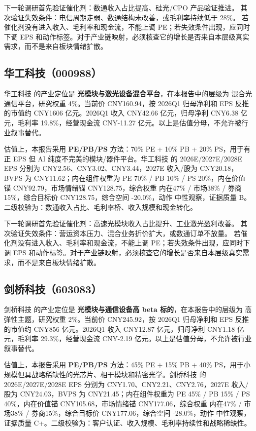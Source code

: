 下一轮调研首先验证催化剂：数通收入占比提高、硅光/CPO 产品验证推进。 其次验证失效条件：电信周期走弱、数通结构未改善，或毛利率持续低于 28\%。 若催化剂没有进入收入、毛利率和现金流，不能上调 PE；若失效条件出现，应同时下调 EPS 和动作标签。对于产业链映射，必须核查它的增长是否来自本层级真实需求，而不是来自板块情绪扩散。


\subsection{华工科技（000988）}
华工科技 的产业定位是 \textbf{光模块与激光设备混合平台}，在本报告中的层级为 混合光通信平台，研究权重 4\%。当前价 CNY160.94，按 2026Q1 归母净利和 EPS 反推的市值约 CNY1606 亿元。2026Q1 收入 CNY42.66 亿元，归母净利 CNY6.38 亿元，毛利率 19.8\%，经营现金流 CNY-11.27 亿元。以上是估值分母，不允许被行业叙事替代。

估值上，本报告采用 \textbf{PE/PB/PS} 方法：70\% PE + 10\% PB + 20\% PS，用于有正 EPS 但 AI 纯度不完美的模块/器件平台。华工科技 的 2026E/2027E/2028E EPS 分别为 CNY2.56、CNY3.02、CNY3.44，2027E 收入/股为 CNY20.18，BVPS 为 CNY11.62；内在组件权重为 PE 70\% / PB 10\% / PS 20\%，内在价值锚 CNY92.79，市场情绪锚 CNY128.75，综合权重 内在47\% / 市场38\% / 券商15\%，综合目标价 CNY128.75，综合空间 -20.0\%，动作 中性观察，证据质量 B。二级校验为：数通收入占比、毛利率桥、收入规模和现金转化。

下一轮调研首先验证催化剂：高速光模块收入占比提升、工业激光盈利改善。 其次验证失效条件：营运资本压力、混合业务折价扩大，或数通订单不放量。 若催化剂没有进入收入、毛利率和现金流，不能上调 PE；若失效条件出现，应同时下调 EPS 和动作标签。对于产业链映射，必须核查它的增长是否来自本层级真实需求，而不是来自板块情绪扩散。


\subsection{剑桥科技（603083）}
剑桥科技 的产业定位是 \textbf{光模块与通信设备高 beta 标的}，在本报告中的层级为 高弹性主题，研究权重 2\%。当前价 CNY245.92，按 2026Q1 归母净利和 EPS 反推的市值约 CNY856 亿元。2026Q1 收入 CNY12.87 亿元，归母净利 CNY1.18 亿元，毛利率 29.3\%，经营现金流 CNY-2.19 亿元。以上是估值分母，不允许被行业叙事替代。

估值上，本报告采用 \textbf{PE/PB/PS} 方法：45\% PE + 15\% PB + 40\% PS，用于小规模但具战略稀缺性的光芯片、相干模块和精密光学。剑桥科技 的 2026E/2027E/2028E EPS 分别为 CNY1.70、CNY2.21、CNY2.76，2027E 收入/股为 CNY24.03，BVPS 为 CNY21.45；内在组件权重为 PE 45\% / PB 15\% / PS 40\%，内在价值锚 CNY105.68，市场情绪锚 CNY177.06，综合权重 内在47\% / 市场38\% / 券商15\%，综合目标价 CNY177.06，综合空间 -28.0\%，动作 中性观察，证据质量 C+。二级校验为：客户认证、收入规模、毛利率持续性和战略稀缺性。

